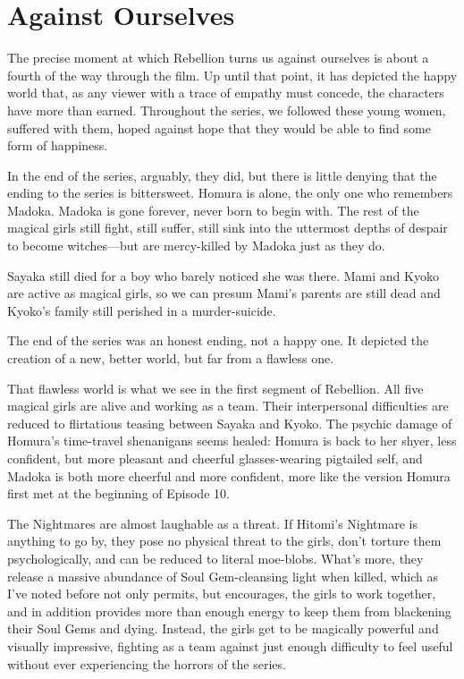 \chapter{Against Ourselves}
The precise moment at which Rebellion turns us against ourselves is about a fourth of the way through the film. Up until that point, it has depicted the happy world that, as any viewer with a trace of empathy must concede, the characters have more than earned. Throughout the series, we followed these young women, suffered with them, hoped against hope that they would be able to find some form of happiness.

In the end of the series, arguably, they did, but there is little denying that the ending to the series is bittersweet. Homura is alone, the only one who remembers Madoka. Madoka is gone forever, never born to begin with. The rest of the magical girls still fight, still suffer, still sink into the uttermost depths of despair to become witches—but are mercy-killed by Madoka just as they do. 

Sayaka still died for a boy who barely noticed she was there. Mami and Kyoko are active as magical girls, so we can presum Mami's parents are still dead and Kyoko's family still perished in a murder-suicide. 

The end of the series was an honest ending, not a happy one. It depicted the creation of a new, better world, but far from a flawless one. 

That flawless world is what we see in the first segment of Rebellion. All five magical girls are alive and working as a team. Their interpersonal difficulties are reduced to flirtatious teasing between Sayaka and Kyoko. The psychic damage of Homura's time-travel shenanigans seems healed: Homura is back to her shyer, less confident, but more pleasant and cheerful glasses-wearing pigtailed self, and Madoka is both more cheerful and more confident, more like the version Homura first met at the beginning of Episode 10. 

The Nightmares are almost laughable as a threat. If Hitomi's Nightmare is anything to go by, they pose no physical threat to the girls, don't torture them psychologically, and can be reduced to literal moe-blobs. What's more, they release a massive abundance of Soul Gem-cleansing light when killed, which as I've noted before not only permits, but encourages, the girls to work together, and in addition provides more than enough energy to keep them from blackening their Soul Gems and dying. Instead, the girls get to be magically powerful and visually impressive, fighting as a team against just enough difficulty to feel useful without ever experiencing the horrors of the series. 

